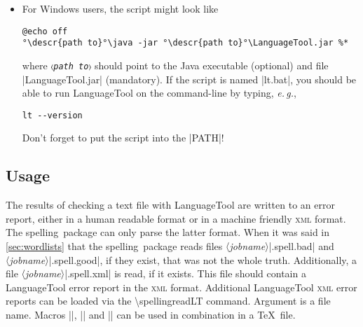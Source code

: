 \documentclass[11pt]{article}
\newcommand*{\pkg}{\textsf{spelling}}
\newcommand*{\acr}[1]{\mbox{\scshape#1}}
\newcommand*{\descr}[1]{〈\emph{#1}〉}
\newcommand*{\cmd}[1]{\mbox{\ttfamily\textbackslash#1}}
\newcommand*{\macro}[1]{\cmd{#1}\marginpar{\cmd{#1}}}
\newcommand*{\latinphrase}[1]{\foreignlanguage{latin}{\emph{#1}}}
\newcommand*{\lpeg}{\latinphrase{e.\,g.}\xspace}
\begin{document}
\begin{enumerate}
\begin{itemize}
\begin{lstlisting}[escapeinside=°°]
#!/bin/sh
°\descr{path to}°/java -jar °\descr{path to}°/LanguageTool.jar $*
\end{lstlisting}
%
    where \texttt{\descr{path to}} should point to the Java executable
    (optional) and file |LanguageTool.jar| (mandatory).  If the script
    is named |lt.sh|, you should be able to run LanguageTool on the
    command shell by typing, \lpeg,

\begin{lstlisting}
sh lt.sh --version
\end{lstlisting}
%
    Don't forget to put the script into the |PATH|!  For other ways of
    making scripts executable, please consult the operating system
    documentation.

  \item For Windows users, the script might look like

\begin{lstlisting}[escapeinside=°°]
@echo off
°\descr{path to}°\java -jar °\descr{path to}°\LanguageTool.jar %*
\end{lstlisting}
%
    where \texttt{\descr{path to}} should point to the Java executable
    (optional) and file |LanguageTool.jar| (mandatory).  If the script
    is named |lt.bat|, you should be able to run LanguageTool on the
    command-line by typing, \lpeg,

\begin{lstlisting}
lt --version
\end{lstlisting}
%
    Don't forget to put the script into the |PATH|!

  \end{itemize}

\end{enumerate}


\subsection{Usage}
\label{sec:lt-usage}

The results of checking a text file with LanguageTool are written to an
error report, either in a human readable format or in a machine friendly
\acr{xml} format.  The \pkg\ package can only parse the latter format.
When it was said in \autoref{sec:wordlists} that the \pkg\ package reads
files \descr{jobname}|.spell.bad| and \descr{jobname}|.spell.good|, if
they exist, that was not the whole truth.  Additionally, a file
\descr{jobname}|.spell.xml| is read, if it exists.  This file should
contain a LanguageTool error report in the \acr{xml} format.  Additional
LanguageTool \acr{xml} error reports can be loaded via the
\macro{spellingreadLT} command.  Argument is a file name.  Macros
|\spellingreadLT|, |\spellingreadbad| and |\spellingreadgood| can be
used in combination in a \TeX\ file.
\end{document}

